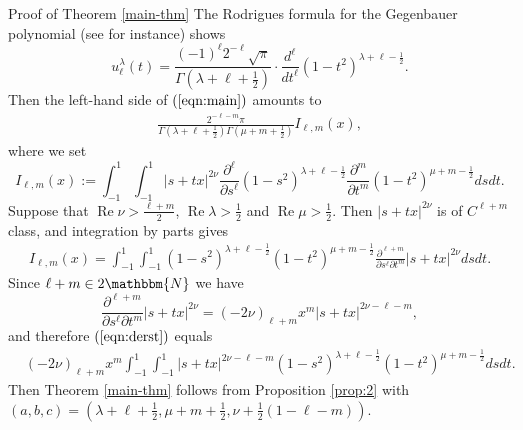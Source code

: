 \documentclass[12pt]{article}
\numberwithin{equation}{section}
\newcommand{\assign}{:=}
\newcommand{\tmop}[1]{\ensuremath{\operatorname{#1}}}
\newenvironment{proof*}[1]{\noindent\textbf{#1\ }}{\hspace*{\fill}$\Box$\medskip}
\newcommand{\mygrammarfootnote}[1]{}
\begin{document}
\begin{proof*}{Proof of Theorem \ref{main-thm}}
  The Rodrigues formula for the Gegenbauer polynomial (see
  {\cite[(6.4.14)]{andrews2000special}} for instance) shows
  \begin{equation} u_{\ell}^{\lambda} (t) = \frac{(- 1)^{\ell} 2^{- \ell} \sqrt{\pi}}{\Gamma
     \left( \lambda + \ell + \frac{1}{2} \right)} \cdot \frac{d^{\ell}}{d
     t^{\ell}} (1 - t^2)^{\lambda + \ell - \frac{1}{2}} . 
     \label{eqn:Rod} \end{equation}
  Then\mygrammarfootnote{maybe, we need a comma here?} the left-hand side of
  $(\ref{eqn:main})$ amounts to
  \begin{eqnarray}
    & \displaystyle\frac{2^{- \ell - m} \pi}{\Gamma \left( \lambda + \ell + \frac{1}{2}
    \right) \Gamma \left( \mu + m + \frac{1}{2} \right)} I_{\ell, m} (x), & 
    \nonumber
  \end{eqnarray}
  where we set
  \[ I_{\ell, m} (x) \assign \displaystyle\int_{- 1}^1 \displaystyle\int_{- 1}^1 | s + tx |^{2 \nu}
     \frac{\partial^{\ell}}{\partial s^{\ell}} (1 - s^2)^{\lambda + \ell -
     \frac{1}{2}} \frac{\partial^m}{\partial t^m} (1 - t^2)^{\mu + m -
     \frac{1}{2}} d s d t. \]
  Suppose that $\tmop{Re} \nu > \frac{\ell + m}{2}$, $\tmop{Re} \lambda >
  \frac{1}{2}$ and $\tmop{Re} \mu > \frac{1}{2}$. Then $| s + tx |^{2 \nu}$ is
  of $C^{\ell + m}$ class, and integration by parts gives
  \begin{eqnarray}
    & I_{\ell, m} (x) = \displaystyle\int_{- 1}^1 \displaystyle\int_{- 1}^1 (1 - s^2)^{\lambda + \ell -
    \frac{1}{2}} (1 - t^2)^{\mu + m - \frac{1}{2}} \frac{\partial^{\ell +
    m}}{\partial s^{\ell} \partial t^m} | s + t x |^{2 \nu} d s d t. 
    \label{eqn:derst} & 
  \end{eqnarray}
  Since $\ell + m \in 2\mathbbm{N}$ we have
  \[ \frac{\partial^{\ell + m}}{\partial s^{\ell} \partial t^m} | s + tx |^{2
     \nu} = (- 2 \nu)_{\ell + m} x^m | s + t x |^{2 \nu - \ell - m}, \]
  and therefore $(\ref{eqn:derst})$ equals
  \begin{eqnarray}
    & (- 2 \nu)_{\ell + m} x^m \displaystyle\int_{- 1}^1 \displaystyle\int_{- 1}^1 | s + t x |^{2 \nu -
    \ell - m} (1 - s^2)^{\lambda + \ell - \frac{1}{2}} (1 - t^2)^{\mu + m -
    \frac{1}{2}} d s d t. &  \nonumber
  \end{eqnarray}
  Then Theorem \ref{main-thm} follows from Proposition \ref{prop:2} with $(a,
  b, c) = \left( \lambda + \ell + \frac{1}{2}, \mu + m + \frac{1}{2}, \nu +
  \frac{1}{2} (1 - \ell - m) \right)$.
\end{proof*}
\end{document}
